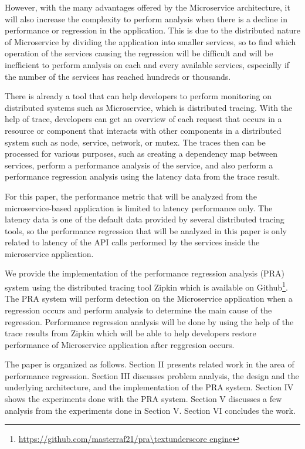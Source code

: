 \documentclass[conference]{configs/IEEEtran}
\begin{document}
However, with the many advantages offered by the Microservice architecture, it will also increase the complexity to perform analysis when there is a decline in performance or regression in the application. This is due to the distributed nature of Microservice by dividing the application into smaller services, so to find which operation of the services causing the regression will be difficult and will be inefficient to perform analysis on each and every available services, especially if the number of the services has reached hundreds or thousands.

There is already a tool that can help developers to perform monitoring on distributed systems such as Microservice, which is distributed tracing. With the help of trace, developers can get an overview of each request that occurs in a resource or component that interacts with other components in a distributed system such as node, service, network, or mutex. The traces then can be processed for various purposes, such as creating a dependency map between services, perform a performance analysis of the service, and also perform a performance regression analysis using the latency data from the trace result.

For this paper, the performance metric that will be analyzed from the microservice-based application is limited to latency performance only. The latency data is one of the default data provided by several distributed tracing tools, so the performance regression that will be analyzed in this paper is only related to latency of the API calls performed by the services inside the microservice application.

We provide the implementation of the performance regression analysis (PRA) system using the distributed tracing tool Zipkin which is available on Github\footnote{\url{https://github.com/masterraf21/pra\textunderscore engine}}. The PRA system will perform detection on the Microservice application when a regression occurs and perform analysis to determine the main cause of the regression. Performance regression analysis will be done by using the help of the trace results from Zipkin which will be able to help developers restore performance of Microservice application after reggresion occurs.

The paper is organized as follows. Section II presents related
work in the area of performance regression. Section III discusses problem analysis, the design and the underlying architecture, and the implementation of the PRA system. Section IV shows the experiments done with the PRA system. Section V discusses a few analysis from the experiments done in Section V. Section
VI concludes the work.
\end{document}

